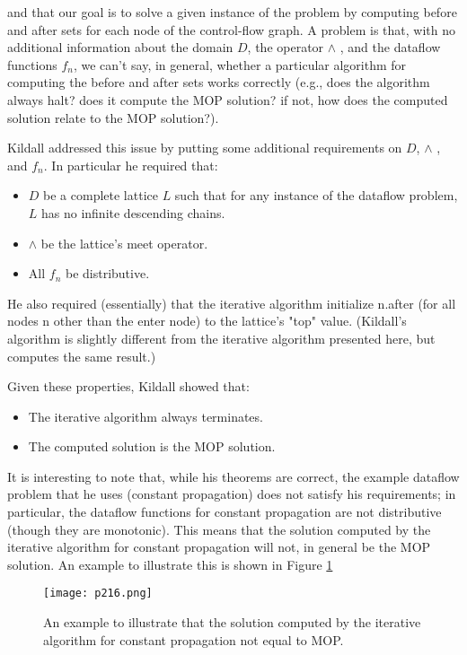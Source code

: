 and that our goal is to solve a given instance of the problem by computing
	{\color{red} before} and {\color{red} after} sets for each node of the control-flow graph.
A problem is that, with no additional information about the domain $D$,
the operator $\wedge$ , and the dataflow functions $f_n$, we can't say,
in general, whether a particular algorithm for computing the before
and after sets works correctly (e.g., does the algorithm always halt?
does it compute the MOP solution? if not, how does the computed solution
relate to the MOP solution?).


Kildall addressed this issue by putting some additional requirements
on $D$, $\wedge$ , and $f_n$. In particular he required that:


\begin{itemize}
	\item  $D$ be a complete lattice $L$ such that for any instance of the dataflow problem, $L$ has no infinite descending chains.
	\item  $\wedge$ be the lattice's meet operator.
	\item  All $f_n$ be distributive.
\end{itemize}
He also required (essentially) that the iterative algorithm initialize n.after (for all nodes n other than the enter node) to the lattice's "top" value. (Kildall's algorithm is slightly different from the iterative algorithm presented here, but computes the same result.)

Given these properties, Kildall showed that:
\begin{itemize}
	\item The iterative algorithm always terminates.
	\item The computed solution is the MOP solution.

\end{itemize}

It is interesting to note that, while his theorems are correct,
the example dataflow problem that he uses (constant propagation)
does not satisfy his requirements; in particular, the dataflow functions for
constant propagation are not distributive (though they are monotonic).
This means that the solution computed by the iterative algorithm for constant
propagation will not, in general be the MOP solution. An example to
illustrate this is shown in Figure \ref{fig:p216}


\begin{figure}[H]
	\centering
	\texttt{[image: p216.png]}
	\caption{An example to illustrate that the
		solution computed by the iterative algorithm for constant propagation not equal to MOP.}
	\label{fig:p216}
\end{figure}


